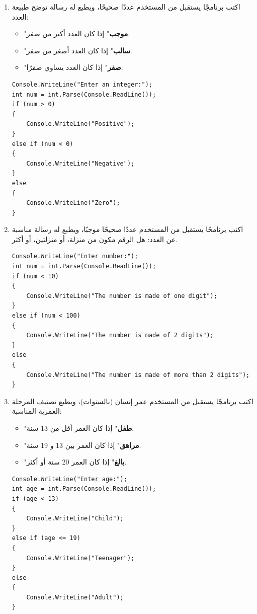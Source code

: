 \documentclass[14pt]{extarticle}
\begin{document}
\begin{enumerate}[resume, itemsep=2em]

\item
اكتب برنامجًا يستقبل من المستخدم عددًا صحيحًا، ويطبع له رسالة توضح طبيعة العدد:
\begin{itemize}
\item "\textbf{موجب}" إذا كان العدد أكبر من صفر.
\item "\textbf{سالب}" إذا كان العدد أصغر من صفر.
\item "\textbf{صفر}" إذا كان العدد يساوي صفرًا.
\end{itemize}
\ifwithsols
\begin{boxSolution}
\begin{english}
\begin{verbatim}
Console.WriteLine("Enter an integer:");
int num = int.Parse(Console.ReadLine());
if (num > 0)
{
    Console.WriteLine("Positive");
}
else if (num < 0)
{
    Console.WriteLine("Negative");
}
else
{
    Console.WriteLine("Zero");
}
\end{verbatim}
\end{english}
\end{boxSolution}
\fi

\filbreak
\item
اكتب برنامجًا يستقبل من المستخدم عددًا صحيحًا موجبًا، ويطبع له رسالة مناسبة عن العدد: هل الرقم مكون من منزلة، أو منزلتين، أو أكثر.
\ifwithsols
\begin{boxSolution}
\begin{english}
\begin{verbatim}
Console.WriteLine("Enter number:");
int num = int.Parse(Console.ReadLine());
if (num < 10)
{
    Console.WriteLine("The number is made of one digit");
}
else if (num < 100)
{
    Console.WriteLine("The number is made of 2 digits");
}
else
{
    Console.WriteLine("The number is made of more than 2 digits");
}
\end{verbatim}
\end{english}
\end{boxSolution}
\fi

\filbreak
\item
اكتب برنامجًا يستقبل من المستخدم عمر إنسان (بالسنوات)، ويطبع تصنيف المرحلة العمرية المناسبة:
\begin{itemize}
\item "\textbf{طفل}" إذا كان العمر أقل من 13 سنة.
\item "\textbf{مراهق}" إذا كان العمر بين 13 و 19 سنة.
\item "\textbf{بالغ}" إذا كان العمر 20 سنة أو أكثر.
\end{itemize}
\ifwithsols
\begin{boxSolution}
\begin{english}
\begin{verbatim}
Console.WriteLine("Enter age:");
int age = int.Parse(Console.ReadLine());
if (age < 13)
{
    Console.WriteLine("Child");
}
else if (age <= 19)
{
    Console.WriteLine("Teenager");
}
else
{
    Console.WriteLine("Adult");
}
\end{verbatim}
\end{english}
\end{boxSolution}
\fi


\end{enumerate}
\end{document}
